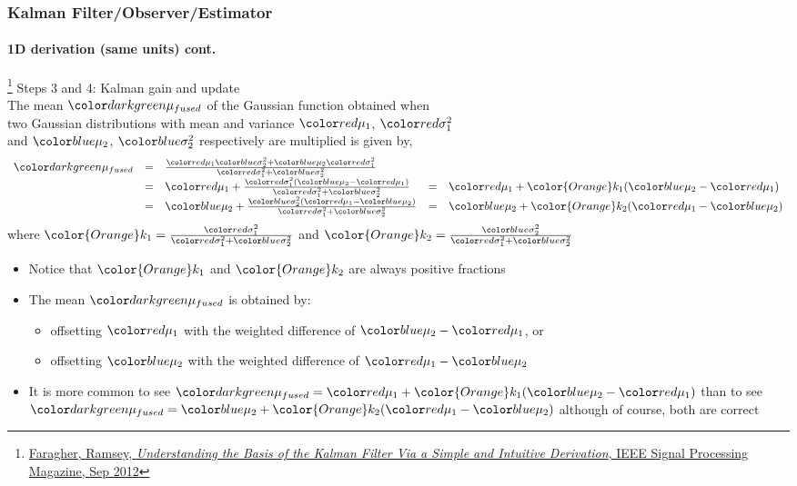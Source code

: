 \documentclass{beamer}
\begin{document}
\begin{frame}
\frametitle{Kalman Filter/Observer/Estimator}
\framesubtitle{1D derivation (same units) \tiny cont.}

\footnote{\tiny\hspace{-0.23in} \href{http://www.cl.cam.ac.uk/~rmf25/papers/Understanding the Basis of the Kalman Filter.pdf}{Faragher, Ramsey, \emph{Understanding the Basis of the Kalman Filter Via a Simple and Intuitive Derivation}, IEEE Signal Processing Magazine, Sep 2012}}
\scriptsize
Steps 3 and 4: {\color{orange}Kalman gain} and {\color{darkgreen}update}\\
The mean $\mufused$ of the Gaussian function obtained when \\two Gaussian distributions with mean and variance $\muone$, $\varone$\\ and $\mutwo$, $\vartwo$ respectively are multiplied is given by,
\begin{equation*}
\begin{array}{rlllllll}
\mufused &=& \frac { \muone \vartwo + \mutwo \varone }{\varone + \vartwo}\\
&=&\muone + \frac{\varone(\mutwo-\muone)}{\varone + \vartwo}&=&\muone  + {\color{Orange}k_1}(\mutwo-\muone)\\
&=&\mutwo + \frac{\vartwo(\muone-\mutwo)}{\varone + \vartwo}&=&\mutwo  + {\color{Orange}k_2}(\muone-\mutwo)
\end{array}
\end{equation*}
where ${\color{Orange}k_1}=\frac{\varone}{\varone + \vartwo}$ and ${\color{Orange}k_2}=\frac{\vartwo}{\varone + \vartwo}$
\begin{itemize}\scriptsize
\item Notice that ${\color{Orange}k_1}$ and ${\color{Orange}k_2}$ are always positive fractions
\item The mean $\mufused$ is obtained by:
\begin{itemize}\scriptsize
\item offsetting $\muone$ with the weighted difference of $\mutwo-\muone$, or 
\item offsetting $\mutwo$ with the weighted difference of $\muone-\mutwo$
\end{itemize}
\item It is more common to see 
$\mufused=\muone  + {\color{Orange}k_1}(\mutwo-\muone)$ than to see $\mufused=\mutwo  + {\color{Orange}k_2}(\muone-\mutwo)$ although of course, both are correct
\end{itemize}
\end{frame}
\end{document}
